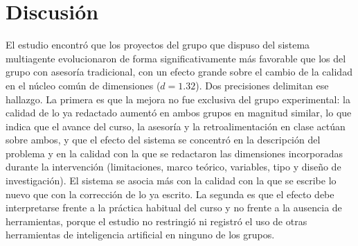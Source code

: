 \documentclass[journal]{IEEEtran}
\begin{document}
\section{Discusión}

El estudio encontró que los proyectos del grupo que dispuso del sistema multiagente evolucionaron de forma significativamente más favorable que los del grupo con asesoría tradicional, con un efecto grande sobre el cambio de la calidad en el núcleo común de dimensiones ($d = 1.32$). Dos precisiones delimitan ese hallazgo. La primera es que la mejora no fue exclusiva del grupo experimental: la calidad de lo ya redactado aumentó en ambos grupos en magnitud similar, lo que indica que el avance del curso, la asesoría y la retroalimentación en clase actúan sobre ambos, y que el efecto del sistema se concentró en la descripción del problema y en la calidad con la que se redactaron las dimensiones incorporadas durante la intervención (limitaciones, marco teórico, variables, tipo y diseño de investigación). El sistema se asocia más con la calidad con la que se escribe lo nuevo que con la corrección de lo ya escrito. La segunda es que el efecto debe interpretarse frente a la práctica habitual del curso y no frente a la ausencia de herramientas, porque el estudio no restringió ni registró el uso de otras herramientas de inteligencia artificial en ninguno de los grupos.
\end{document}
